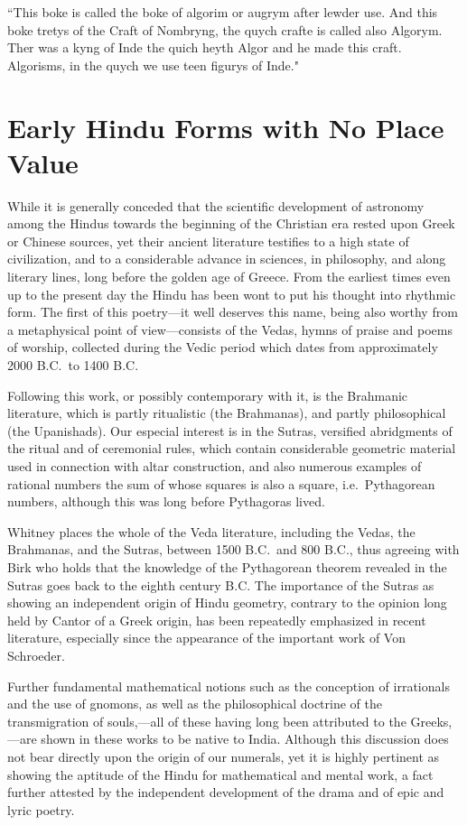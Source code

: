 \documentclass[11pt,a4paper]{article}
\begin{document}
``This boke is called the boke of algorim or augrym after lewder use. And this boke tretys of the Craft of Nombryng, the quych crafte is called also Algorym. Ther was a kyng of Inde the quich heyth Algor and he made this craft. Algorisms, in the quych we use teen figurys of Inde."


\section{Early Hindu Forms with No Place Value}

While it is generally conceded that the scientific development of astronomy among the Hindus towards the beginning of the Christian era rested upon Greek or Chinese sources, yet their ancient literature testifies to a high state of civilization, and to a considerable advance in sciences, in philosophy, and along literary lines, long before the golden age of Greece. From the earliest times even up to the present day the Hindu has been wont to put his thought into rhythmic form. The first of this poetry---it well deserves this name, being also worthy from a metaphysical point of view---consists of the Vedas, hymns of praise and poems of worship, collected during the Vedic period which dates from approximately 2000 B.C.\ to 1400 B.C.

Following this work, or possibly contemporary with it, is the Brahmanic literature, which is partly ritualistic (the Brahmanas), and partly philosophical (the Upanishads). Our especial interest is in the Sutras, versified abridgments of the ritual and of ceremonial rules, which contain considerable geometric material used in connection with altar construction, and also numerous examples of rational numbers the sum of whose squares is also a square, i.e.\ Pythagorean numbers, although this was long before Pythagoras lived.

Whitney places the whole of the Veda literature, including the Vedas, the Brahmanas, and the Sutras, between 1500 B.C.\ and 800 B.C., thus agreeing with Birk who holds that the knowledge of the Pythagorean theorem revealed in the Sutras goes back to the eighth century B.C. The importance of the Sutras as showing an independent origin of Hindu geometry, contrary to the opinion long held by Cantor of a Greek origin, has been repeatedly emphasized in recent literature, especially since the appearance of the important work of Von Schroeder.

Further fundamental mathematical notions such as the conception of irrationals and the use of gnomons, as well as the philosophical doctrine of the transmigration of souls,---all of these having long been attributed to the Greeks,---are shown in these works to be native to India. Although this discussion does not bear directly upon the origin of our numerals, yet it is highly pertinent as showing the aptitude of the Hindu for mathematical and mental work, a fact further attested by the independent development of the drama and of epic and lyric poetry.
\end{document}
